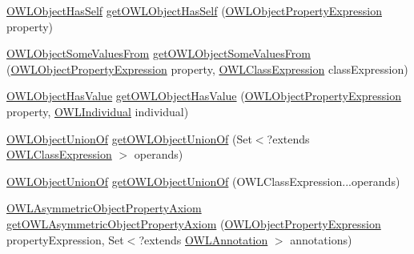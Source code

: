 \begin{DoxyCompactItemize}
\item 
\hyperlink{interfaceorg_1_1semanticweb_1_1owlapi_1_1model_1_1_o_w_l_object_has_self}{O\-W\-L\-Object\-Has\-Self} \hyperlink{classuk_1_1ac_1_1manchester_1_1cs_1_1owl_1_1owlapi_1_1_o_w_l_data_factory_impl_a09486ed94c61628554ea3d7e76534097}{get\-O\-W\-L\-Object\-Has\-Self} (\hyperlink{interfaceorg_1_1semanticweb_1_1owlapi_1_1model_1_1_o_w_l_object_property_expression}{O\-W\-L\-Object\-Property\-Expression} property)
\item 
\hyperlink{interfaceorg_1_1semanticweb_1_1owlapi_1_1model_1_1_o_w_l_object_some_values_from}{O\-W\-L\-Object\-Some\-Values\-From} \hyperlink{classuk_1_1ac_1_1manchester_1_1cs_1_1owl_1_1owlapi_1_1_o_w_l_data_factory_impl_a55d3e48838f74e601c305b9d3d0c8862}{get\-O\-W\-L\-Object\-Some\-Values\-From} (\hyperlink{interfaceorg_1_1semanticweb_1_1owlapi_1_1model_1_1_o_w_l_object_property_expression}{O\-W\-L\-Object\-Property\-Expression} property, \hyperlink{interfaceorg_1_1semanticweb_1_1owlapi_1_1model_1_1_o_w_l_class_expression}{O\-W\-L\-Class\-Expression} class\-Expression)
\item 
\hyperlink{interfaceorg_1_1semanticweb_1_1owlapi_1_1model_1_1_o_w_l_object_has_value}{O\-W\-L\-Object\-Has\-Value} \hyperlink{classuk_1_1ac_1_1manchester_1_1cs_1_1owl_1_1owlapi_1_1_o_w_l_data_factory_impl_aaef830997ea5261882f73b52f8518da8}{get\-O\-W\-L\-Object\-Has\-Value} (\hyperlink{interfaceorg_1_1semanticweb_1_1owlapi_1_1model_1_1_o_w_l_object_property_expression}{O\-W\-L\-Object\-Property\-Expression} property, \hyperlink{interfaceorg_1_1semanticweb_1_1owlapi_1_1model_1_1_o_w_l_individual}{O\-W\-L\-Individual} individual)
\item 
\hyperlink{interfaceorg_1_1semanticweb_1_1owlapi_1_1model_1_1_o_w_l_object_union_of}{O\-W\-L\-Object\-Union\-Of} \hyperlink{classuk_1_1ac_1_1manchester_1_1cs_1_1owl_1_1owlapi_1_1_o_w_l_data_factory_impl_afd6d09fa64ccf48e0ecff74c26210862}{get\-O\-W\-L\-Object\-Union\-Of} (Set$<$?extends \hyperlink{interfaceorg_1_1semanticweb_1_1owlapi_1_1model_1_1_o_w_l_class_expression}{O\-W\-L\-Class\-Expression} $>$ operands)
\item 
\hyperlink{interfaceorg_1_1semanticweb_1_1owlapi_1_1model_1_1_o_w_l_object_union_of}{O\-W\-L\-Object\-Union\-Of} \hyperlink{classuk_1_1ac_1_1manchester_1_1cs_1_1owl_1_1owlapi_1_1_o_w_l_data_factory_impl_a679cd20de8c67ca9e05848602e0be9d9}{get\-O\-W\-L\-Object\-Union\-Of} (O\-W\-L\-Class\-Expression...\-operands)
\item 
\hyperlink{interfaceorg_1_1semanticweb_1_1owlapi_1_1model_1_1_o_w_l_asymmetric_object_property_axiom}{O\-W\-L\-Asymmetric\-Object\-Property\-Axiom} \hyperlink{classuk_1_1ac_1_1manchester_1_1cs_1_1owl_1_1owlapi_1_1_o_w_l_data_factory_impl_a8ea5a130093a565149b5cddf5938a2d2}{get\-O\-W\-L\-Asymmetric\-Object\-Property\-Axiom} (\hyperlink{interfaceorg_1_1semanticweb_1_1owlapi_1_1model_1_1_o_w_l_object_property_expression}{O\-W\-L\-Object\-Property\-Expression} property\-Expression, Set$<$?extends \hyperlink{interfaceorg_1_1semanticweb_1_1owlapi_1_1model_1_1_o_w_l_annotation}{O\-W\-L\-Annotation} $>$ annotations)

\end{DoxyCompactItemize}
